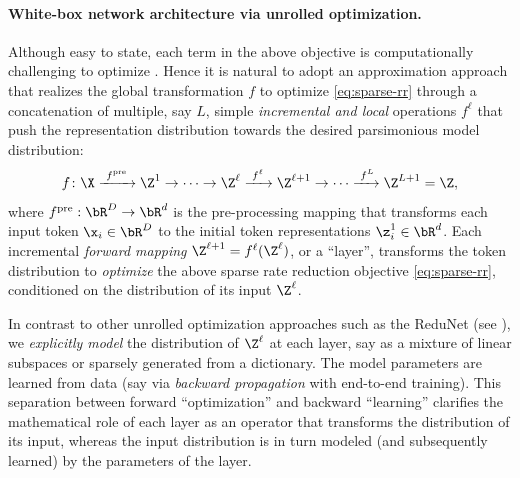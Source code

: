\documentclass[../../book-main.tex]{subfiles}
\begin{document}
\paragraph{White-box network architecture via unrolled optimization.}

Although easy to state, each term in the above objective is
computationally challenging to optimize \cite{Wright-Ma-2022}. Hence
it is natural to adopt an approximation approach that realizes the
global transformation $f$ to optimize
\eqref{eq:sparse-rr} through a concatenation of multiple, say $L$,
simple \textit{incremental and local} operations $f^\ell$ that push
the representation distribution towards the desired parsimonious
model distribution:
\begin{equation}
    f\colon \X \xrightarrow{\hspace{1mm} f^{\mathrm{pre}} \hspace{1mm}}
    \Z^1 \rightarrow \cdots \rightarrow \Z^\ell
    \xrightarrow{\hspace{1mm} f^{\ell} \hspace{1mm}} \Z^{\ell+1}
    \rightarrow  \cdots \xrightarrow{\hspace{1mm} f^{L}} \Z^{L+1} = \Z,
    \label{eq:incremental}
\end{equation}
where $f^{\mathrm{pre}}: \bR^{D} \rightarrow \bR^{d}$ is the pre-processing
mapping that transforms each input token $\x_{i} \in \bR^{D}$ to the
initial token representations $\z_{i}^{1} \in \bR^{d}$.
Each incremental \textit{forward mapping} $\Z^{\ell + 1} =
f^\ell(\Z^\ell)$, or a ``layer'', transforms the token distribution
to \textit{optimize} the above sparse rate reduction objective
\eqref{eq:sparse-rr}, conditioned on the distribution of its input $\Z^\ell$.

\begin{remark}
    In contrast to other unrolled optimization approaches such as the
    ReduNet (see ), we
    \textit{explicitly model} the distribution of $\Z^\ell$ at each
    layer, say as a mixture of linear subspaces or sparsely generated
    from a dictionary. The model parameters are learned from data
    (say via \textit{backward propagation} with end-to-end training).
    This separation between forward ``optimization'' and backward
    ``learning'' clarifies the mathematical role of each layer as an operator
    that transforms the distribution of its input, whereas the input
    distribution is in turn modeled (and subsequently learned) by the
    parameters of the layer.
\end{remark}
\end{document}
